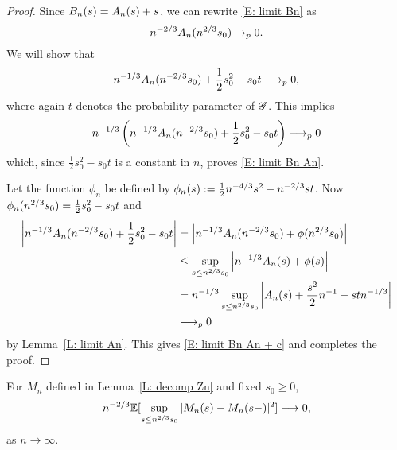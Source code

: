 \begin{proof} \label{P: limit Bn}
	Since $B_n(s) = A_n(s) + s$, we can rewrite \eqref{E: limit Bn} as
	\begin{equation} \label{E: limit Bn An}
	n^{-2 / 3} A_n(n^{2 / 3}s_0) \rightarrow_p 0.
	\end{equation}
	We will show that
	\begin{equation} \label{E: limit Bn An + c}
	n^{-1 / 3} A_n(n^{-2 / 3}s_0) + \frac{1}{2}s_0^2 - s_0t \longrightarrow_p 0,
	\end{equation}
	where again $t$ denotes the probability parameter of $\mathscr{G}$. 
	This implies
	\begin{equation*}
	n^{-1 / 3} \left( n^{-1 / 3} A_n(n^{-2 / 3}s_0) + \frac{1}{2}s_0^2 - s_0t \right) \longrightarrow_p 0
	\end{equation*}
	which, since $\frac{1}{2}s_0^2 - s_0t$ is a constant in $n$, proves \eqref{E: limit Bn An}.
	
	Let the function $\phi_n$ be defined by $\phi_n(s) := \frac{1}{2}n^{-4 / 3}s^2 - n^{-2 / 3}st$.	
	Now $\phi_n(n^{2 / 3}s_0) = \frac{1}{2}s_0^2 - s_0t$ and
	\begin{align*}
	\left| n^{-1 / 3} A_n(n^{-2 / 3}s_0) + \frac{1}{2}s_0^2 - s_0t \right| 
	&= \left| n^{-1 / 3} A_n(n^{-2 / 3}s_0) + \phi(n^{2 / 3}s_0) \right| \\
	&\leq \sup_{s \leq n^{2 / 3} s_0 } \left| n^{-1 / 3} A_n(s) + \phi(s) \right| \\
	&= n^{-1 / 3} \sup_{s \leq n^{2 / 3} s_0 } \left| A_n(s) + \frac{s^2}{2}n^{-1} - stn^{-1 / 3} \right| \\
	&\longrightarrow_p 0
	\end{align*}
	by Lemma~\ref{L: limit An}. This gives \eqref{E: limit Bn An + c} and completes the proof.
\end{proof}


\begin{lemma} \label{L: limit Mn}
	For $M_n$ defined in Lemma~\ref{L: decomp Zn} and fixed $s_0 \geq 0$,
	\begin{equation} \label{E: limit Mn}
	n^{-2 / 3} \mathbb{E}[\sup_{s \leq n^{2 / 3} s_0 } |M_n(s) - M_n(s-)|^2] \longrightarrow 0,
	\end{equation}
	as $n\longrightarrow \infty$.
\end{lemma}

